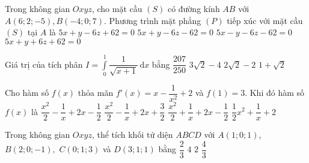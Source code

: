 \begin{ex}%
Trong không gian $O x y z$, cho mặt cầu $(S)$ có đường kính $A B$ với $A(6 ; 2 ;-5), B(-4 ; 0 ; 7)$. Phương trình mặt phẳng $(P)$ tiếp xúc với mặt cầu $(S)$ tại $A$ là
\choice
{$5 x+y-6 z+62=0$}
{\True $5 x+y-6 z-62=0$}
{$5 x-y-6 z-62=0$}
{$5 x+y+6 z+62=0$}
\end{ex}

\begin{ex}%
Giá trị của tích phân $I=\displaystyle\int\limits_{0}^{1}\dfrac{1}{\sqrt{x+1}}\mathrm{\, d}x$ bằng
\choice
{$\dfrac{207}{250}$}
{$3\sqrt{2}-4$}
{\True $2\sqrt{2}-2$}
{$1+\sqrt{2}$}
\end{ex}

\begin{ex}%
Cho hàm số $ f(x) $ thỏa mãn $ f'(x)=x-\dfrac{1}{x^2}+2 $ và $ f(1)=3 $. Khi đó hàm số $ f(x) $ là
\choice
{$ \dfrac{x^2}{2}-\dfrac{1}{x}+2x-\dfrac{1}{2} $}
{$ \dfrac{x^2}{2}-\dfrac{1}{x}+2x+\dfrac{3}{2} $}
{\True $ \dfrac{x^2}{2}+\dfrac{1}{x}+2x-\dfrac{1}{2} $}
{$ \dfrac{1}{2}x^2+\dfrac{1}{x}+2 $}
\end{ex}

\begin{ex}%
Trong không gian $Oxyz$, thể tích khối tứ diện $ABCD$ với $A(1;0;1)$, $B(2;0;-1), $ $C(0;1;3)$ và $D(3; 1; 1)$ bằng \choice
{\True $\dfrac{2}{3} $}
{$4 $}
{$ 2 $}
{$\dfrac{4}{3}$}
\end{ex}

